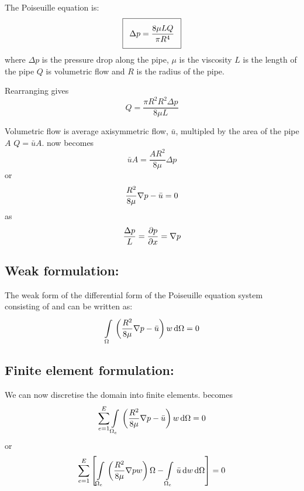 The Poiseuille equation is:
\begin{equation}
  \addtolength{\fboxsep}{5pt}
  \boxed{
    \Delta{p}=\dfrac{8\mu LQ}{\pi R^{4}}
  }
  \label{eqn:Poiseuille_equation}
\end{equation}
where $\Delta{p}$ is the pressure drop along the pipe, $\mu$ is the viscosity $L$
is the length of the pipe $Q$ is volumetric flow and $R$ is the radius of the
pipe. 

Rearranging  gives
\begin{equation}
  Q=\dfrac{\pi R^{2}R^{2}\Delta{p}}{8\mu L}
\end{equation}

Volumetric flow is average axisymmetric flow, $\bar{u}$, multipled by the area
of the pipe $A$ \ie $Q=\bar{u}A$.  now becomes
\begin{equation}
  \bar{u}A=\dfrac{AR^{2}}{8\mu}\Delta{p}
\end{equation}
or 
\begin{equation}
  \dfrac{R^{2}}{8\mu}\gradient{}{p}-\bar{u}=0
\end{equation}
as
\begin{equation}
  \dfrac{\Delta p}{L}=\delby{p}{x}=\gradient{}{p}
\end{equation}

\subsection{Weak formulation:}

The weak form of the differential form of the Poiseuille equation system
consisting of  and can be written as:
\begin{equation}
  \gint{\Omega}{}{\pbrac{\dfrac{R^{2}}{8\mu}\gradient{}{p}-\bar{u}}w}{\Omega}=0
  \label{eqn:Poiseuilleweakform}
\end{equation}

\subsection{Finite element formulation:}
We can now discretise the domain into finite elements.  becomes
\begin{equation}
  \dsum_{e=1}^{E}\gint{\Omega_{e}}{}{\pbrac{\frac{R^{2}}{8\mu}\gradient{}{p}-\bar{u}}w}{\Omega}=0
  \label{eqn:Poiseullefemform1}
\end{equation}
or
\begin{equation}
  \dsum_{e=1}^{E}\sqbrac{\gint{\Omega_{e}}{}{\pbrac{\frac{R^{2}}{8\mu}\gradient{}{p}w}{\Omega}-\gint{\Omega_{e}}{}{\bar{u}}w}{\Omega}}=0
  \label{eqn:Poiseullefemform2}
\end{equation}

